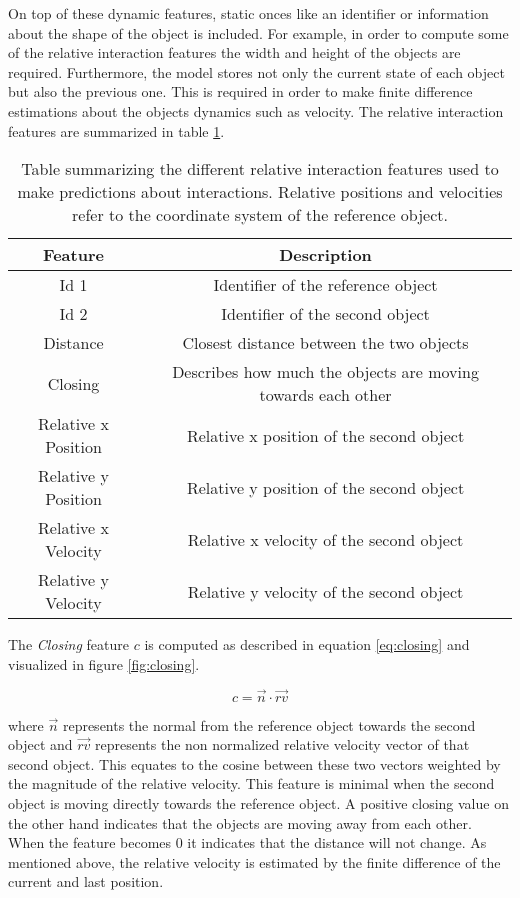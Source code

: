 On top of these dynamic features, static onces like an identifier or information about the shape of the object is included. For example, in order to compute some of the relative interaction features the width and height of the objects are required. Furthermore, the model stores not only the current state of each object but also the previous one. This is required in order to make finite difference estimations about the objects dynamics such as velocity. 
The relative interaction features are summarized in table \ref{tab:gateInteractionFeatures}. 

\begin{table}
	\centering
	\begin{tabular}{|c|c|}
		\hline Feature & Description \\ 
		\hline Id 1 & Identifier of the reference object \\ 
		\hline Id 2 & Identifier of the second object \\ 
		\hline Distance & Closest distance between the two objects \\
		\hline Closing & Describes how much the objects are moving towards each other \\
		\hline Relative x Position & Relative x position of the second object \\
		\hline Relative y Position & Relative y position of the second object \\
		\hline Relative x Velocity & Relative x velocity of the second object \\
		\hline Relative y Velocity & Relative y velocity of the second object \\
		\hline 
	\end{tabular} 
	\caption{Table summarizing the different relative interaction features used to make predictions about interactions. Relative positions and velocities refer to the coordinate system of the reference object.}
	\label{tab:gateInteractionFeatures}
\end{table}

The \textit{Closing} feature $c$ is computed as described in equation \ref{eq:closing} and visualized in figure \ref{fig:closing}.

\begin{equation}
  c = \vec{n} \cdot \vec{rv}
 \label{eq:closing}
\end{equation}

where $\vec{n}$ represents the normal from the reference object towards the second object and $\vec{rv}$ represents the non normalized relative velocity vector of that second object. This equates to the cosine between these two vectors weighted by the magnitude of the relative velocity. This feature is minimal when the second object is moving directly towards the reference object. A positive closing value on the other hand indicates that the objects are moving away from each other. When the feature becomes 0 it indicates that the distance will not change. As mentioned above, the relative velocity is estimated by the finite difference of the current and last position.

